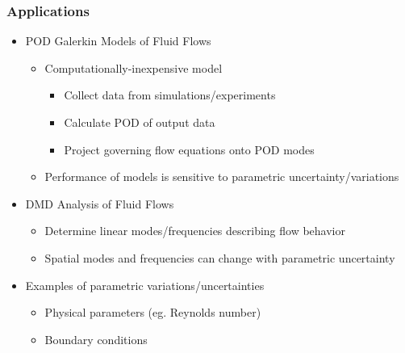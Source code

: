 \documentclass[9pt]{beamer}
\begin{document}
\begin{frame}
\frametitle{Applications}
\label{sec-1-2}

\begin{itemize}
\item POD Galerkin Models of Fluid Flows
\begin{itemize}
\item Computationally-inexpensive model
\begin{itemize}
\item Collect data from simulations/experiments
\item Calculate POD of output data
\item Project governing flow equations onto POD modes
\end{itemize}
\item Performance of models is sensitive to parametric uncertainty/variations
\end{itemize}
\item DMD Analysis of Fluid Flows
\begin{itemize}
\item Determine linear modes/frequencies describing flow behavior
\item Spatial modes and frequencies can change with parametric uncertainty
\end{itemize}
\item Examples of parametric variations/uncertainties
\begin{itemize}
\item Physical parameters (eg. Reynolds number)
\item Boundary conditions
\end{itemize}
\end{itemize}
\end{frame}
\end{document}
